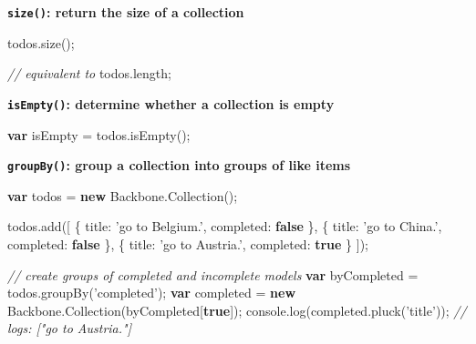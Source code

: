\documentclass[9pt]{book}
\newenvironment{Shaded}{}{}
\newcommand{\KeywordTok}[1]{\textcolor[rgb]{0.00,0.44,0.13}{\textbf{{#1}}}}
\newcommand{\DataTypeTok}[1]{\textcolor[rgb]{0.56,0.13,0.00}{{#1}}}
\newcommand{\StringTok}[1]{\textcolor[rgb]{0.25,0.44,0.63}{{#1}}}
\newcommand{\CommentTok}[1]{\textcolor[rgb]{0.38,0.63,0.69}{\textit{{#1}}}}
\newcommand{\OtherTok}[1]{\textcolor[rgb]{0.00,0.44,0.13}{{#1}}}
\newcommand{\FunctionTok}[1]{\textcolor[rgb]{0.02,0.16,0.49}{{#1}}}
\newcommand{\NormalTok}[1]{{#1}}
\begin{document}
\textbf{\texttt{size()}: return the size of a collection}

\begin{Shaded}
\begin{Highlighting}[]
\OtherTok{todos}\NormalTok{.}\FunctionTok{size}\NormalTok{();}

\CommentTok{// equivalent to}
\OtherTok{todos}\NormalTok{.}\FunctionTok{length}\NormalTok{;}
\end{Highlighting}
\end{Shaded}

\textbf{\texttt{isEmpty()}: determine whether a collection is empty}

\begin{Shaded}
\begin{Highlighting}[]
\KeywordTok{var} \NormalTok{isEmpty = }\OtherTok{todos}\NormalTok{.}\FunctionTok{isEmpty}\NormalTok{();}
\end{Highlighting}
\end{Shaded}

\textbf{\texttt{groupBy()}: group a collection into groups of like
items}

\begin{Shaded}
\begin{Highlighting}[]
\KeywordTok{var} \NormalTok{todos = }\KeywordTok{new} \OtherTok{Backbone}\NormalTok{.}\FunctionTok{Collection}\NormalTok{();}

\OtherTok{todos}\NormalTok{.}\FunctionTok{add}\NormalTok{([}
  \NormalTok{\{ }\DataTypeTok{title}\NormalTok{: }\StringTok{'go to Belgium.'}\NormalTok{, }\DataTypeTok{completed}\NormalTok{: }\KeywordTok{false} \NormalTok{\},}
  \NormalTok{\{ }\DataTypeTok{title}\NormalTok{: }\StringTok{'go to China.'}\NormalTok{, }\DataTypeTok{completed}\NormalTok{: }\KeywordTok{false} \NormalTok{\},}
  \NormalTok{\{ }\DataTypeTok{title}\NormalTok{: }\StringTok{'go to Austria.'}\NormalTok{, }\DataTypeTok{completed}\NormalTok{: }\KeywordTok{true} \NormalTok{\}}
\NormalTok{]);}

\CommentTok{// create groups of completed and incomplete models}
\KeywordTok{var} \NormalTok{byCompleted = }\OtherTok{todos}\NormalTok{.}\FunctionTok{groupBy}\NormalTok{(}\StringTok{'completed'}\NormalTok{);}
\KeywordTok{var} \NormalTok{completed = }\KeywordTok{new} \OtherTok{Backbone}\NormalTok{.}\FunctionTok{Collection}\NormalTok{(byCompleted[}\KeywordTok{true}\NormalTok{]);}
\OtherTok{console}\NormalTok{.}\FunctionTok{log}\NormalTok{(}\OtherTok{completed}\NormalTok{.}\FunctionTok{pluck}\NormalTok{(}\StringTok{'title'}\NormalTok{));}
\CommentTok{// logs: ["go to Austria."]}
\end{Highlighting}
\end{Shaded}
\end{document}
